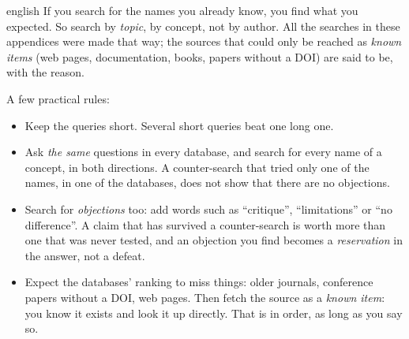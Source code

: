 \begin{onlyin}{english} %
If you search for the names you already know, you find what you
expected.  So search by \emph{topic}, by concept, not by author.  All
the searches in these appendices were made that way; the sources that
could only be reached as \emph{known items} (web pages, documentation,
books, papers without a DOI) are said to be, with the reason.

A few practical rules:
\begin{itemize}
  \item Keep the queries short.  Several short queries beat one long
    one.
  \item Ask \emph{the same} questions in every database, and search for
    every name of a concept, in both directions.  A counter-search that
    tried only one of the names, in one of the databases, does not show
    that there are no objections.
  \item Search for \emph{objections} too: add words such as
    \enquote{critique}, \enquote{limitations} or \enquote{no
    difference}.  A claim that has survived a counter-search is worth
    more than one that was never tested, and an objection you find
    becomes a \emph{reservation} in the answer, not a defeat.
  \item Expect the databases' ranking to miss things: older journals,
    conference papers without a DOI, web pages.  Then fetch the source
    as a \emph{known item}: you know it exists and look it up directly.
    That is in order, as long as you say so.
\end{itemize}
\end{onlyin}

